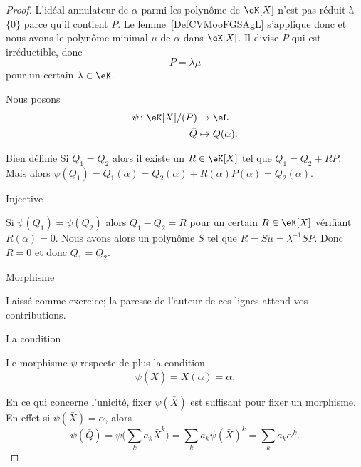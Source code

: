 \begin{proof}
    L'idéal annulateur de \( \alpha\) parmi les polynôme de \( \eK[X]\) n'est pas réduit à \( \{ 0 \}\) parce qu'il contient \( P\). Le lemme~\ref{DefCVMooFGSAgL} s'applique donc et nous avons le polynôme minimal \( \mu\) de \( \alpha\) dans \( \eK[X]\). Il divise \( P\) qui est irréductible, donc
    \begin{equation}
        P=\lambda \mu
    \end{equation}
    pour un certain \( \lambda\in \eK\).

    Nous posons
    \begin{equation}
        \begin{aligned}
            \psi\colon \eK[X]/(P)&\to \eL \\
            \bar Q&\mapsto Q(\alpha).
        \end{aligned}
    \end{equation}
    \begin{subproof}
        \item[Bien définie]
            Si \( \bar Q_1=\bar Q_2\) alors il existe un \( R\in \eK[X]\) tel que \( Q_1=Q_2+RP\). Mais alors \( \psi(\bar Q_1)=Q_1(\alpha)=Q_2(\alpha)+R(\alpha)P(\alpha)=Q_2(\alpha)\).
        \item[Injective]

            Si \( \psi(\bar Q_1)=\psi(\bar Q_2)\) alors \( Q_1-Q_2=R\) pour un certain \( R\in \eK[X]\) vérifiant \( R(\alpha)=0\). Nous avons alors un polynôme \( S\) tel que \( R=S\mu=\lambda^{-1}SP\). Donc \( \bar R=0\) et donc \( \bar Q_1=\bar Q_2\).

        \item[Morphisme]

            Laissé comme exercice; la paresse de l'auteur de ces lignes attend vos contributions.

        \item[La condition]

            Le morphisme \( \psi\) respecte de plus la condition
            \begin{equation}
                \psi(\bar X)=X(\alpha)=\alpha.
            \end{equation}

    \end{subproof}

    En ce qui concerne l'unicité, fixer \( \psi(\bar X)\) est suffisant pour fixer un morphisme. En effet si \( \psi(\bar X)=\alpha\), alors
    \begin{equation}
        \psi(\bar Q)=\psi\Big( \sum_ka_k\bar X^k \Big)=\sum_ka_k\psi(\bar X)^k=\sum_ka_k\alpha^k.
    \end{equation}


\end{proof}
